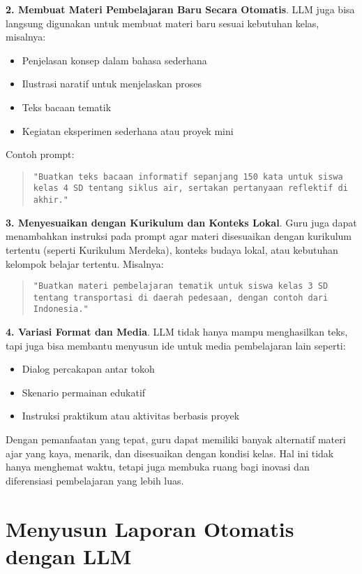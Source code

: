 \textbf{2. Membuat Materi Pembelajaran Baru Secara Otomatis}.  
LLM juga bisa langsung digunakan untuk membuat materi baru sesuai kebutuhan kelas, misalnya:
\begin{itemize}
	\item Penjelasan konsep dalam bahasa sederhana
	\item Ilustrasi naratif untuk menjelaskan proses
	\item Teks bacaan tematik
	\item Kegiatan eksperimen sederhana atau proyek mini
\end{itemize}

Contoh prompt:

\begin{quote}
	\centering
	\texttt{"Buatkan teks bacaan informatif sepanjang 150 kata untuk siswa kelas 4 SD tentang siklus air, sertakan pertanyaan reflektif di akhir."}
\end{quote}

\textbf{3. Menyesuaikan dengan Kurikulum dan Konteks Lokal}.  
Guru juga dapat menambahkan instruksi pada prompt agar materi disesuaikan dengan kurikulum tertentu (seperti Kurikulum Merdeka), konteks budaya lokal, atau kebutuhan kelompok belajar tertentu. Misalnya:

\begin{quote}
	\centering
	\texttt{"Buatkan materi pembelajaran tematik untuk siswa kelas 3 SD tentang transportasi di daerah pedesaan, dengan contoh dari Indonesia."}
\end{quote}

\textbf{4. Variasi Format dan Media}.  
LLM tidak hanya mampu menghasilkan teks, tapi juga bisa membantu menyusun ide untuk media pembelajaran lain seperti:
\begin{itemize}
	\item Dialog percakapan antar tokoh
	\item Skenario permainan edukatif
	\item Instruksi praktikum atau aktivitas berbasis proyek
\end{itemize}

Dengan pemanfaatan yang tepat, guru dapat memiliki banyak alternatif materi ajar yang kaya, menarik, dan disesuaikan dengan kondisi kelas. Hal ini tidak hanya menghemat waktu, tetapi juga membuka ruang bagi inovasi dan diferensiasi pembelajaran yang lebih luas.

\section{Menyusun Laporan Otomatis dengan LLM}

